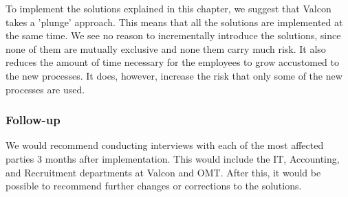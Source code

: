 To implement the solutions explained in this chapter, we suggest that Valcon takes a 'plunge' approach.
This means that all the solutions are implemented at the same time.
We see no reason to incrementally introduce the solutions, since none of them are mutually exclusive and none them carry much risk.
It also reduces the amount of time necessary for the employees to grow accustomed to the new processes.
It does, however, increase the risk that only some of the new processes are used.

\subsubsection{Follow-up}
We would recommend conducting interviews with each of the most affected parties 3 months after implementation.
This would include the IT, Accounting, and Recruitment departments at Valcon and OMT.
After this, it would be possible to recommend further changes or corrections to the solutions.
